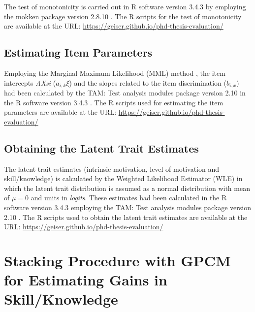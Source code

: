 The test of monotonicity is carried out in R software version 3.4.3 \cite{RCoreTeam2017} by employing the mokken package version 2.8.10 \cite{VanderArk2012,VanderArk2007}. The R scripts for the test of monotonicity are available at the URL: \url{https://geiser.github.io/phd-thesis-evaluation/}

\subsection{Estimating Item Parameters}
\label{sec:estimating-parameters-irt-motivation}

Employing the Marginal Maximum Likelihood (MML) method \cite{BockAitkin1981}, the item intercepts \emph{AXsi} ($a_{i,k} \xi$) and the slopes related to the item discrimination ($b_{i,x}$) had been calculated by the TAM: Test analysis modules package version 2.10 \cite{RobitzschKieferWu2018} in the R software version 3.4.3 \cite{RCoreTeam2017}. The R scripts used for estimating the item parameters are available at the URL: \url{https://geiser.github.io/phd-thesis-evaluation/}

\subsection{Obtaining the Latent Trait Estimates}
\label{sec:obtaining-latent-trait-irt-motivation}

The latent trait estimates (intrinsic motivation, level of motivation and skill/knowledge) is calculated by the Weighted Likelihood Estimator (WLE) \cite{Warm1989} in which the latent trait distribution is assumed as a normal distribution with mean of $\mu = 0$ and units in \emph{logits}. These estimates had been calculated in the R software version 3.4.3 \cite{RCoreTeam2017} employing the TAM: Test analysis modules package version 2.10 \cite{RobitzschKieferWu2018}. The R scripts used to obtain the latent trait estimates are available at the URL: \url{https://geiser.github.io/phd-thesis-evaluation/}


\section{Stacking Procedure with GPCM for Estimating Gains in Skill/Knowledge}
\label{sec:irt-learning-outcomes}

